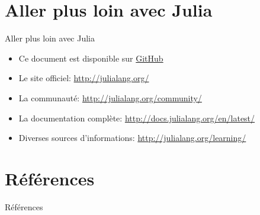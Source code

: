 \section{Aller plus loin avec Julia}
\begin{frame}[containsverbatim]{Aller plus loin avec Julia}
\begin{itemize}
\item Ce document est disponible sur \href{https://github.com/mcanouil/Presentation/tree/master/JULIA_TP}{GitHub}
\vspace{2ex}
\item Le site officiel: \href{http://julialang.org/}{http\hspace{-0.5ex}://julialang.org/}
\item La communauté: \href{http://julialang.org/community/}{http\hspace{-0.5ex}://julialang.org/community/}
\item La documentation complète: \href{http://docs.julialang.org/en/latest/}{http\hspace{-0.5ex}://docs.julialang.org/en/latest/}
\item Diverses sources d’informations: \href{http://julialang.org/learning/}{http\hspace{-0.5ex}://julialang.org/learning/}
\end{itemize}
\end{frame}

\section{Références}
\begin{frame}{Références}
    
    
    \nocite{*}
\end{frame}


